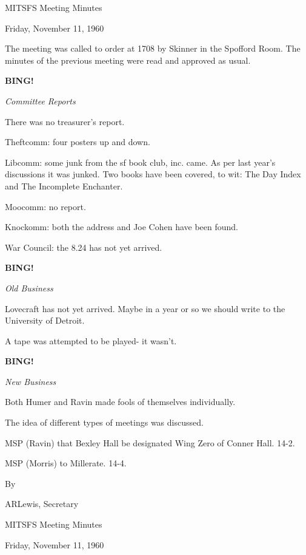 \documentclass[12pt]{article}
\newcommand{\bing}{{\bf BING!} }
\newcommand{\goto}[1]{\bing \vskip 12pt \centerline{{\em{#1}}}}
\begin{document}
\begin{center}

MITSFS Meeting Minutes

Friday, November 11, 1960

\end{center}
 
\vspace{12pt}

\setlength{\parskip}{6pt}

\noindent
The meeting was called to order at 1708 by Skinner in the Spofford Room. The minutes of the previous meeting were read and approved as usual.

\goto{Committee Reports}

There was no treasurer's report.

Theftcomm: four posters up and down.

Libcomm: some junk from the sf book club, inc. came. As per last year's discussions it was junked. Two books have been covered, to wit: The Day Index and The Incomplete Enchanter.

Moocomm: no report.

Knockomm: both the address and Joe Cohen have been found.

War Council: the 8.24 has not yet arrived.

\goto{Old Business}

Lovecraft has not yet arrived. Maybe in a year or so we should write to the University of Detroit.

A tape was attempted to be played- it wasn't.

\goto{New Business}

Both Humer and Ravin made fools of themselves individually.

The idea of different types of meetings was discussed.

MSP (Ravin) that Bexley Hall be designated Wing Zero of Conner Hall. 14-2.

MSP (Morris) to Millerate. 14-4.

\vspace{12pt}

\centerline{By}
\centerline{ARLewis, Secretary}

\begin{center}

MITSFS Meeting Minutes

Friday, November 11, 1960

\end{center}
 
\end{document}
